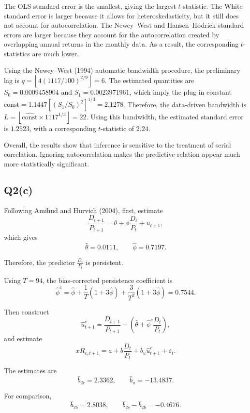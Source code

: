 \documentclass{article}
\begin{document}


The OLS standard error is the smallest, giving the largest \(t\)-statistic. The White standard error is larger because it allows for heteroskedasticity, but it still does not account for autocorrelation. The Newey--West and Hansen--Hodrick standard errors are larger because they account for the autocorrelation created by overlapping annual returns in the monthly data. As a result, the corresponding \(t\)-statistics are much lower.

Using the Newey--West (1994) automatic bandwidth procedure, the preliminary lag is \(q=\left\lfloor 4(1117/100)^{2/9}\right\rfloor=6\). The estimated quantities are \(S_0=0.0009458904\) and \(S_1=0.0023971961\), which imply the plug-in constant \(\widehat{\mathrm{const}}=1.1447\left[\left(S_1/S_0\right)^2\right]^{1/3}=2.1278\). Therefore, the data-driven bandwidth is \(L=\left\lfloor \widehat{\mathrm{const}}\times1117^{1/3}\right\rfloor=22\). Using this bandwidth, the estimated standard error is \(1.2523\), with a corresponding \(t\)-statistic of \(2.24\).

Overall, the results show that inference is sensitive to the treatment of serial correlation. Ignoring autocorrelation makes the predictive relation appear much more statistically significant.




\newpage

\subsection{Q2(c)}

Following Amihud and Hurvich (2004), first, estimate
\[
\frac{D_{t+1}}{P_{t+1}}
=
\theta+\phi\frac{D_t}{P_t}+u_{t+1},
\]
which gives
\[
\hat\theta=0.0111,
\qquad
\hat\phi=0.7197.
\]

Therefore, the predictor $\frac{D_t}{P_t}$ is persistent.

Using \(T=94\), the bias-corrected persistence coefficient is
\[
\hat\phi^c
=
\hat\phi
+\frac{1}{T}(1+3\hat\phi)
+\frac{3}{T^2}(1+3\hat\phi)
=
0.7544.
\]

Then construct
\[
\hat u^c_{t+1}
=
\frac{D_{t+1}}{P_{t+1}}
-
\left(
\hat\theta+\hat\phi^c\frac{D_t}{P_t}
\right),
\]
and estimate
\[
xR_{e,t+1}
=
a+b\frac{D_t}{P_t}
+b_u\hat u^c_{t+1}
+\varepsilon_t.
\]

The estimates are
\[
\hat b_{2c}=2.3362,
\qquad
\hat b_u=-13.4837.
\]

For comparison,
\[
\hat b_{2b}=2.8038,
\qquad
\hat b_{2c}-\hat b_{2b}=-0.4676.
\]
\end{document}
